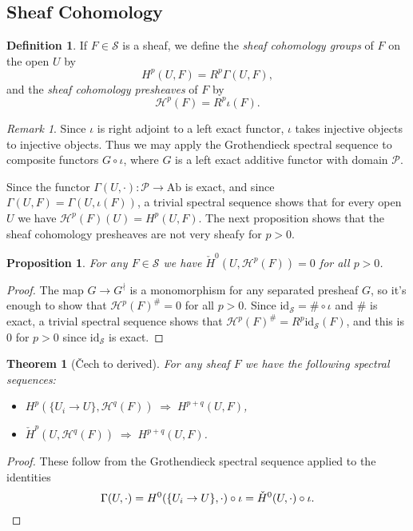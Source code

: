 \documentclass[letterpaper,11pt]{article}
\newtheorem{thm}{Theorem}
\newtheorem{prop}{Proposition}
\theoremstyle{definition}
\newtheorem{defn}{Definition}
\theoremstyle{remark}
\newtheorem{rmk}{Remark}
\begin{document}
\subsection{Sheaf Cohomology}

\begin{defn} If $F\in\mathcal{S}$ is a sheaf, we define the \emph{sheaf cohomology groups} of $F$ on the open $U$ by
\[
H^p(U,F) = R^p\Gamma(U,F),
\]
and the \emph{sheaf cohomology presheaves} of $F$ by
\[
\mathcal{H}^p(F) = R^p\iota(F).
\]
\end{defn}

\begin{rmk} Since $\iota$ is right adjoint to a left exact functor, $\iota$ takes injective objects to injective objects. Thus we may apply the Grothendieck spectral sequence to composite functors $G\circ\iota$, where $G$ is a left exact additive functor with domain $\mathcal{P}$.
\end{rmk}

Since the functor $\Gamma(U,\cdot):\mathcal{P}\rightarrow \mbox{Ab}$ is exact, and since $\Gamma(U,F) = \Gamma(U,\iota(F))$, a trivial spectral sequence shows that for every open $U$ we have $\mathcal{H}^p(F)(U) = H^p(U,F)$. The next proposition shows that the sheaf cohomology presheaves are not very sheafy for $p > 0$.

\begin{prop}\label{not-sheafy} For any $F\in\mathcal{S}$ we have $\check{H}^0(U,\mathcal{H}^p(F)) = 0$ for all $p > 0$.
\end{prop}
\begin{proof} The map $G\rightarrow G^\nmid$ is a monomorphism for any separated presheaf $G$, so it's enough to show that $\mathcal{H}^p(F)^\# = 0$ for all $p > 0$. Since $\mbox{id}_\mathcal{S} = \#\circ\iota$ and $\#$ is exact, a trivial spectral sequence shows that $\mathcal{H}^p(F)^\# = R^p\mbox{id}_\mathcal{S}(F)$, and this is $0$ for $p>0$ since $\mbox{id}_\mathcal{S}$ is exact.
\end{proof}

\begin{thm}[\v{C}ech to derived]\label{cech-to-derived} For any sheaf $F$ we have the following spectral sequences:
\begin{itemize}
\item $H^p(\{U_i\rightarrow U\},\mathcal{H}^q(F)) \; \Rightarrow \; H^{p+q}(U,F)$,

\item $\check{H}^p(U,\mathcal{H}^q(F)) \; \Rightarrow \; H^{p+q}(U,F)$.
\end{itemize}
\end{thm}
\begin{proof} These follow from the Grothendieck spectral sequence applied to the identities
\[
\Gamma(U,\cdot) = H^0(\{U_i\rightarrow U\},\cdot)\circ\iota = \check{H}^0(U,\cdot)\circ\iota.\qedhere
\]
\end{proof}
\end{document}
